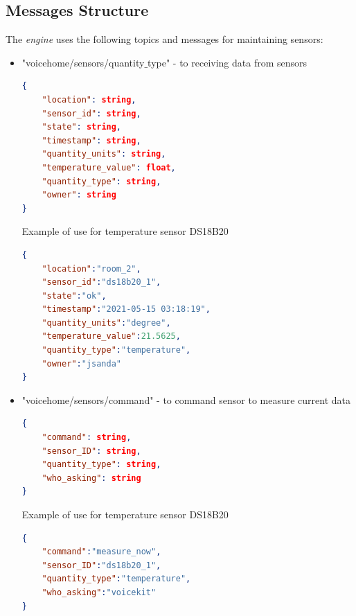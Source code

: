\subsection{Messages Structure}

The \textit{engine} uses the following topics and messages for maintaining sensors:

\begin{itemize}
    \item "voicehome/sensors/quantity$\_$type" - to receiving data from sensors
    \begin{lstlisting}[language=json,firstnumber=1,caption={Structure of JSON message for receiving data from sensors in module \textit{Sensors}},captionpos=b,xleftmargin=1cm]
{
    "location": string,
    "sensor_id": string,
    "state": string,
    "timestamp": string,
    "quantity_units": string,
    "temperature_value": float,
    "quantity_type": string,
    "owner": string
}
    \end{lstlisting}
    Example of use for temperature sensor DS18B20
    \begin{lstlisting}[language=json,firstnumber=1,caption={Structure of JSON message for receiving data from temperature sensor DS18B20 in module \textit{Sensors}},captionpos=b,xleftmargin=1cm]
{
    "location":"room_2",
    "sensor_id":"ds18b20_1",
    "state":"ok",
    "timestamp":"2021-05-15 03:18:19",
    "quantity_units":"degree",
    "temperature_value":21.5625,
    "quantity_type":"temperature",
    "owner":"jsanda"
}
    \end{lstlisting}
    \item "voicehome/sensors/command" - to command sensor to measure current data
    \begin{lstlisting}[language=json,firstnumber=1,caption={Structure of JSON message to command sensor to measure current data in module \textit{Sensors}},captionpos=b,xleftmargin=1cm]
{
    "command": string,
    "sensor_ID": string,
    "quantity_type": string,
    "who_asking": string
}
    \end{lstlisting}
    \newpage
    Example of use for temperature sensor DS18B20
    \begin{lstlisting}[language=json,firstnumber=1,caption={Structure of JSON message to command sensor DS18B20 to measure current data in module \textit{Sensors}},captionpos=b,xleftmargin=1cm]
{
    "command":"measure_now",
    "sensor_ID":"ds18b20_1",
    "quantity_type":"temperature",
    "who_asking":"voicekit"
}
    \end{lstlisting}

\end{itemize}
